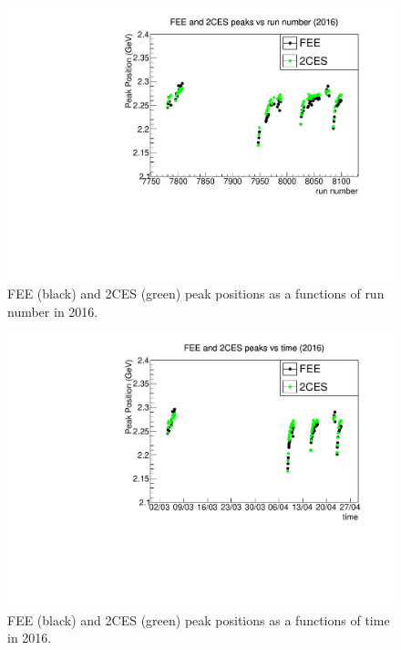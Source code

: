 \documentclass[11pt]{article}
\begin{document}
\begin{figure}[htbp] 
\begin{center}
\includegraphics[width =  .9\textwidth]{figures/2016_run.pdf}
\caption{FEE (black) and 2CES (green) peak positions as a functions of run number in 2016.} 
\label{fig:2016_run}
\end{center}
\end{figure}

\begin{figure}[htbp] 
\begin{center}
\includegraphics[width =  .9\textwidth]{figures/2016_time.pdf}
\caption{FEE (black) and 2CES (green) peak positions as a functions of time in 2016.} 
\label{fig:2016_time}
\end{center}
\end{figure}
\end{document}
